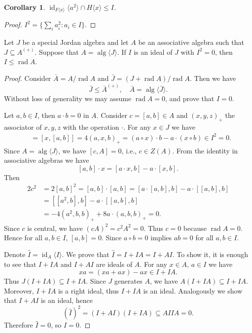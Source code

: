 \documentclass{article}
\newtheorem{corollary}[theorem]{Corollary}
\begin{document}
\begin{corollary}
$\operatorname{id}_{F\langle x\rangle}\langle a^{2}\rangle \cap H\langle x\rangle \leq I$.
\end{corollary}

\begin{proof}
$I^{2} = \{\sum_i a_i^{2} : a_i \in I\}$.
\end{proof}

\begin{lemma}
Let $J$ be a special Jordan algebra and let $A$ be an associative algebra such that $J \subseteq A^{(+)}$. Suppose that $A = \operatorname{alg}\langle J\rangle$. If $I$ is an ideal of $J$ with $I^{2}=0$, then $I \leq \operatorname{rad} A$.
\end{lemma}

\begin{proof}
Consider $\bar{A} = A/\operatorname{rad} A$ and $\bar{J} = (J + \operatorname{rad} A)/\operatorname{rad} A$. Then we have
\[
\bar{J} \leq \bar{A}^{(+)}, \quad \bar{A} = \operatorname{alg}\langle \bar{J}\rangle.
\]
Without loss of generality we may assume $\operatorname{rad} A = 0$, and prove that $I = 0$.

Let $a, b \in I$, then $a \cdot b = 0$ in $A$. Consider $c = [a, b] \in A$ and $(x, y, z)_{+}$ the associator of $x, y, z$ with the operation $\cdot$. For any $x \in J$ we have
\begin{align*}
[x, c] &= [x, [a, b]] = 4(a, x, b)_{+} = (a \circ x) \cdot b - a \cdot (x \circ b) \in I^{2} = 0.
\end{align*}
Since $A = \operatorname{alg}\langle J\rangle$, we have $[c, A] = 0$, i.e., $c \in Z(A)$. From the identity in associative algebras we have
\[
[a, b] \cdot x = [a \cdot x, b] - a \cdot [x, b].
\]
Then
\begin{align*}
2c^{2} &= 2[a, b]^{2} = [a, b] \cdot [a, b] = [a \cdot [a, b], b] - a \cdot [[a, b], b] \\
&= [[a^{2}, b], b] - a \cdot [[a, b], b] \\
&= -4(a^{2}, b, b)_{+} + 8a \cdot (a, b, b)_{+} = 0.
\end{align*}
Since $c$ is central, we have $(cA)^{2} = c^{2}A^{2} = 0$. Thus $c = 0$ because $\operatorname{rad} A = 0$. Hence for all $a, b \in I$, $[a, b] = 0$. Since $a \circ b = 0$ implies $ab = 0$ for all $a, b \in I$.

Denote $\hat{I} = \operatorname{id}_{A}\langle I\rangle$. We prove that $\hat{I} = I + IA = I + AI$. To show it, it is enough to see that $I + IA$ and $I + AI$ are ideals of $A$. For any $x \in A$, $a \in I$ we have
\[
xa = (xa + ax) - ax \in I + IA.
\]
Thus $J(I + IA) \subseteq I + IA$. Since $J$ generates $A$, we have $A(I + IA) \subseteq I + IA$. Moreover, $I + IA$ is a right ideal, thus $I + IA$ is an ideal. Analogously we show that $I + AI$ is an ideal, hence
\[
(\hat{I})^{2} = (I + AI)(I + IA) \subseteq A I I A = 0.
\]
Therefore $\hat{I} = 0$, so $I = 0$.
\end{proof}
\end{document}
